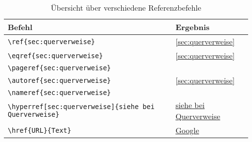 \begin{table}[H]
    \centering
    \begin{tabular}{ll}
        \toprule
        \textbf{Befehl}                                                              & \textbf{Ergebnis}                                   \\
        \midrule
        \texttt{\textbackslash ref\{sec:querverweise\}}                              & \ref{sec:querverweise}                              \\
        \texttt{\textbackslash eqref\{sec:querverweise\}}                            & \eqref{sec:querverweise}                            \\
        \texttt{\textbackslash pageref\{sec:querverweise\}}                          & \pageref{sec:querverweise}                          \\
        \texttt{\textbackslash autoref\{sec:querverweise\}}                          & \autoref{sec:querverweise}                          \\
        \texttt{\textbackslash nameref\{sec:querverweise\}}                          & \nameref{sec:querverweise}                          \\
        \texttt{\textbackslash hyperref[sec:querverweise]\{siehe bei Querverweise\}} & \hyperref[sec:querverweise]{siehe bei Querverweise} \\
        \texttt{\textbackslash href\{URL\}\{Text\}}                                  & \href{https://www.google.de}{Google}                \\
        \bottomrule
    \end{tabular}
    \caption{Übersicht über verschiedene Referenzbefehle}
    \label{tab:querverweise}
\end{table}